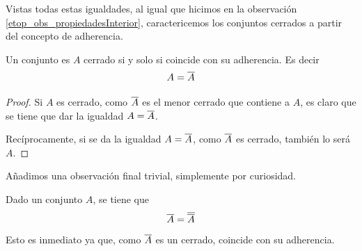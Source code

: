 Vistas todas estas igualdades, al igual que hicimos en la observación \ref{etop_obs_propiedadesInterior}, caractericemos los conjuntos cerrados a partir del concepto de adherencia.
\begin{prop}
	\label{etop_prop_cerradosAdher}
	Un conjunto es $A$ cerrado si y solo si coincide con su adherencia. Es decir
	\begin{equation*}
	A=\overline{A}
	\end{equation*}
\end{prop}
\begin{proof}
	Si $A$ es cerrado, como $\overline{A}$ es el menor cerrado que contiene a $A$, es claro que se tiene que dar la igualdad $A=\overline{A}$.
	
	Recíprocamente, si se da la igualdad $A=\overline{A}$, como $\overline{A}$ es cerrado, también lo será $A$.
\end{proof}
Añadimos una observación final trivial, simplemente por curiosidad.
\begin{obs}
	Dado un conjunto $A$, se tiene que
	\begin{equation*}
	\overline{A}=\overline{\overline{A}}
	\end{equation*}
	Esto es inmediato ya que, como $\overline{A}$ es un cerrado, coincide con su adherencia.
\end{obs}
